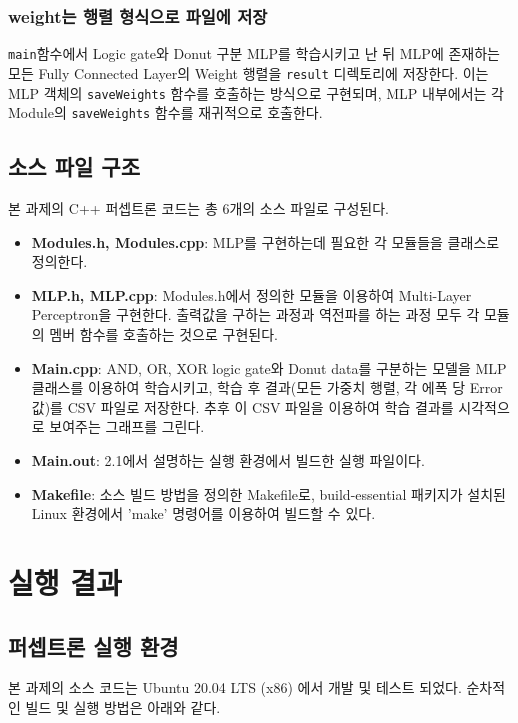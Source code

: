 \documentclass[letterpaper,10pt]{article}
\begin{document}
	\subsubsection{weight는 행렬 형식으로 파일에 저장}
	
	\verb|main|함수에서 Logic gate와 Donut 구분 MLP를 학습시키고 난 뒤 MLP에 존재하는 모든 Fully Connected Layer의 Weight 행렬을 \verb|result| 디렉토리에 저장한다. 이는 MLP 객체의 \verb|saveWeights| 함수를 호출하는 방식으로 구현되며, MLP 내부에서는 각 Module의 \verb|saveWeights| 함수를 재귀적으로 호출한다.
	
	\subsection{소스 파일 구조}
	
	본 과제의 C++ 퍼셉트론 코드는 총 6개의 소스 파일로 구성된다.
	
	\begin{itemize}
		\item \textbf{Modules.h, Modules.cpp}: MLP를 구현하는데 필요한 각 모듈들을 클래스로 정의한다.
		\item \textbf{MLP.h, MLP.cpp}: Modules.h에서 정의한 모듈을 이용하여 Multi-Layer Perceptron을 구현한다. 출력값을 구하는 과정과 역전파를 하는 과정 모두 각 모듈의 멤버 함수를 호출하는 것으로 구현된다.
		\item \textbf{Main.cpp}: AND, OR, XOR logic gate와 Donut data를 구분하는 모델을 MLP 클래스를 이용하여 학습시키고, 학습 후 결과(모든 가중치 행렬, 각 에폭 당 Error 값)를 CSV 파일로 저장한다. 추후 이 CSV 파일을 이용하여 학습 결과를 시각적으로 보여주는 그래프를 그린다.
		\item \textbf{Main.out}: 2.1에서 설명하는 실행 환경에서 빌드한 실행 파일이다.
		\item \textbf{Makefile}: 소스 빌드 방법을 정의한 Makefile로, build-essential 패키지가 설치된 Linux 환경에서 ’make’ 명령어를 이용하여 빌드할 수 있다.
	\end{itemize}
	
	\section{실행 결과}
	
	\subsection{퍼셉트론 실행 환경}
	
	본 과제의 소스 코드는 Ubuntu 20.04 LTS (x86) 에서 개발 및 테스트 되었다. 순차적인 빌드 및 실행 방법은 아래와 같다.
	
\end{document}

